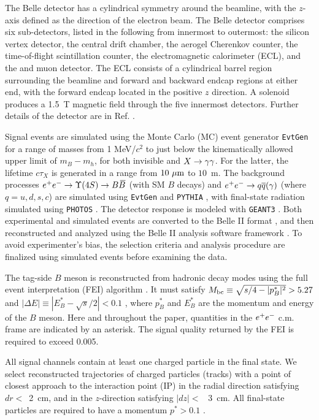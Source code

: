The Belle detector has a cylindrical symmetry around the beamline, with the $z$-axis defined as the direction of the electron beam. The Belle detector comprises six sub-detectors, listed in the following from innermost to outermost: the silicon vertex detector, the central drift chamber, the aerogel Cherenkov counter, the time-of-flight scintillation counter, the electromagnetic calorimeter (ECL), and the \KL and muon detector. The ECL consists of a cylindrical barrel region surrounding the beamline and forward and backward endcap regions at either end, with the forward endcap located in the positive $z$ direction. A solenoid produces a 1.5~T magnetic field through the five innermost detectors. Further details of the detector are in Ref. \cite{Belle:2000cnh}.


Signal events are simulated using the Monte Carlo (MC) event generator \verb|EvtGen| \cite{Lange:2001uf} for a range of \Xinv masses from 1 MeV/$c^2$ to just below the kinematically allowed upper limit of $m_B - m_h$, for both invisible \Xinv and $X\rightarrow\gamma\gamma$. For the latter, the lifetime $c\tau_X$ is generated in a range from $10\ \mu\rm{m}$ to $10$~m. The background processes $e^+e^-\rightarrow\Upsilon(4S) \rightarrow B\kern 0.18em\overline{\kern -0.18em B}{}$ (with SM $B$ decays) and $e^+e^- \rightarrow q\overline q(\gamma)$ (where $q = {u,d,s,c}$) are simulated using \verb|EvtGen| and \verb|PYTHIA| \cite{Sj_strand_2006}, with final-state radiation simulated using \verb|PHOTOS| \cite{Barberio:1993qi}. The detector response is modeled with \verb|GEANT3| \cite{Brun:1987ma}. Both experimental and simulated events are converted to the Belle II format \cite{Gelb_2018}, and then reconstructed and analyzed using the Belle II analysis software framework \cite{Kuhr_2018, the_belle_ii_collaboration_2022_6949513}. To avoid experimenter’s bias, the selection criteria and analysis procedure are finalized using simulated events before examining the data.


The tag-side $B$ meson is reconstructed from hadronic decay modes using the full event interpretation (FEI) algorithm \cite{Keck_2019}. It must satisfy $M_{\rm{bc}} \equiv \sqrt{s/4 - |p^{*}_{B}|^2} > 5.27$ \gevcc and $|\Delta E| \equiv |E^*_B - \sqrt{s}/2| < 0.1$ \gev, where $p^*_B$ and $E^*_B$ are the momentum and energy of the $B$ meson. Here and throughout the paper, quantities in the $e^+e^-$ c.m. frame are indicated by an asterisk. The signal quality returned by the FEI is required to exceed 0.005.


All signal channels contain at least one charged particle in the final state. We select reconstructed trajectories of charged particles (tracks) with a point of closest approach to the interaction point (IP) in the radial direction satisfying $dr <$~2~cm, and in the $z$-direction satisfying $|dz| <$~ 3~cm. All final-state particles are required to have a momentum $p^* > 0.1$ \gevc.

